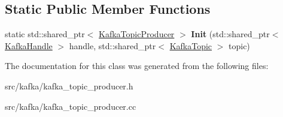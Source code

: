 \subsection*{Static Public Member Functions}
\begin{DoxyCompactItemize}
\item 
static std\+::shared\+\_\+ptr$<$ \hyperlink{classlog2hdfs_1_1KafkaTopicProducer}{Kafka\+Topic\+Producer} $>$ {\bfseries Init} (std\+::shared\+\_\+ptr$<$ \hyperlink{classlog2hdfs_1_1KafkaHandle}{Kafka\+Handle} $>$ handle, std\+::shared\+\_\+ptr$<$ \hyperlink{classlog2hdfs_1_1KafkaTopic}{Kafka\+Topic} $>$ topic)\hypertarget{classlog2hdfs_1_1KafkaTopicProducer_a94b88fe64b7731d76e507616b8ae6deb}{}\label{classlog2hdfs_1_1KafkaTopicProducer_a94b88fe64b7731d76e507616b8ae6deb}

\end{DoxyCompactItemize}


The documentation for this class was generated from the following files\+:\begin{DoxyCompactItemize}
\item 
src/kafka/kafka\+\_\+topic\+\_\+producer.\+h\item 
src/kafka/kafka\+\_\+topic\+\_\+producer.\+cc\end{DoxyCompactItemize}
